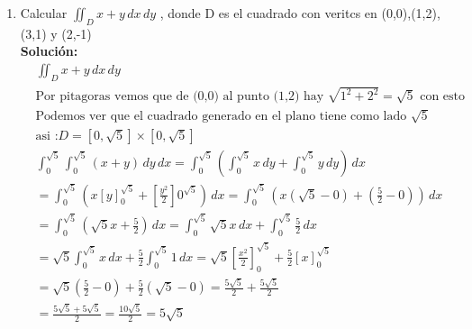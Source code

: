 \documentclass[10pt,letterpaper,fleqn]{article}
\begin{document}
\begin{enumerate}
		\newpage
        \item Calcular $\iint_D{x+y} \, dx\,dy$ , donde D es el cuadrado con veritcs en (0,0),(1,2),(3,1) y (2,-1)
    	\\ \textbf{Solución:}
            	\begin{equation*}
                \begin{split}
                        & 
                        \iint_D{x+y} \, dx\,dy
                        \\& \mbox{Por pitagoras vemos que de (0,0) al punto (1,2) hay $\sqrt{1^2 + 2^2 } = \sqrt{5}$ con esto}
                        \\& \mbox{Podemos ver que el cuadrado generado en el plano tiene como lado $\sqrt{5}$ }
                        \\& \mbox{asi :} D = [0,\sqrt{5}] \times [0,\sqrt{5}]
                        \\& \int_{0}^{\sqrt{5}}{\int_{0}^{\sqrt{5}}{(x+y )}\,dy}\,dx
                        =\int_{0}^{\sqrt{5}}{(\int_{0}^{\sqrt{5}}{x}\,dy +\int_{0}^{\sqrt{5}}{y}\,dy)}\,dx
                        \\& =\int_{0}^{\sqrt{5}}{(x \left[y\right]_0^{\sqrt{5}} +\left[\frac{y^2}{2}\right]0^{\sqrt{5}})}\,dx
                        =\int_{0}^{\sqrt{5}}{( x(\sqrt{5}-0) +(\frac{5}{2}-0)) }\,dx
                        \\& =\int_{0}^{\sqrt{5}}{(\sqrt{5}x +\frac{5}{2})}\,dx
                        =\int_{0}^{\sqrt{5}}{\sqrt{5} x }\,dx+\int_{0}^{\sqrt{5}}{\frac{5}{2}}\,dx
                        \\& =\sqrt{5} \int_{0}^{\sqrt{5}}{ x }\,dx+\frac{5}{2} \int_{0}^{\sqrt{5}}{ 1 }\,dx
                        =\sqrt{5} \left[\frac{x^2}{2}\right]_0^{\sqrt{5}} + \frac{5}{2} \left[x\right]_0^{\sqrt{5}}
                        \\& =\sqrt{5} (\frac{5}{2}-0) + \frac{5}{2} (\sqrt{5}-0)
                        =\frac{5\sqrt{5}}{2} + \frac{5\sqrt{5}}{2}
                        \\& = \frac{5\sqrt{5} + 5\sqrt{5} }{2}
                        = \frac{10\sqrt{5}}{2} 
                        = 5\sqrt{5} 
                \end{split}
                \end{equation*}
		
    \end{enumerate}
        
\end{document}
